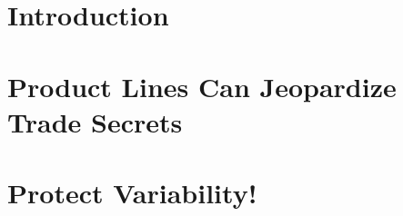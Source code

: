 \documentclass{sig-alternate}
\begin{document}
\maketitle

\begin{abstract}

\end{abstract}




\section{Introduction}


\section{Product Lines Can Jeopardize\\ Trade Secrets} %
\label{sec:casestudy}


% 

% 

% 

\section{Protect Variability!}
\label{sec:summary}


% 
\end{document}
